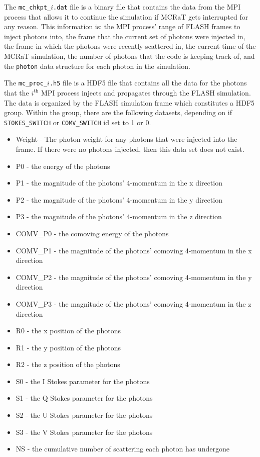\documentclass[12pt,a4paper]{article}
\begin{document}
The \texttt{mc\_chkpt\_$i$.dat} file is a binary file that contains the data from the MPI process that allows it to continue the simulation if MCRaT gets interrupted for any reason. This information is: the MPI process' range of FLASH frames to inject photons into, the frame that the current set of photons were injected in, the frame in which the photons were recently scattered in, the current time of the MCRaT simulation, the number of photons that the code is keeping track of, and the \texttt{photon} data structure for each photon in the simulation.

The \texttt{mc\_proc\_$i$.h5} file is a HDF5 file that contains all the data for the photons that the $i^\mathrm{th}$ MPI process injects and propagates through the FLASH simulation. The data is organized by the FLASH simulation frame which constitutes a HDF5 group. Within the group, there are the following datasets, depending on if \texttt{STOKES\_SWITCH} or \texttt{COMV\_SWITCH} id set to 1 or 0.
\begin{itemize}
\item Weight - The photon weight for any photons that were injected into the frame. If there were no photons injected, then this data set does not exist.
\item P0 - the energy of the photons
\item P1 - the magnitude of the photons' 4-momentum in the x direction
\item P2 - the magnitude of the photons' 4-momentum in the y direction 
\item P3 - the magnitude of the photons' 4-momentum in the z direction
\item COMV\_P0 - the comoving energy of the photons
\item COMV\_P1 - the magnitude of the photons' comoving 4-momentum in the x direction
\item COMV\_P2 - the magnitude of the photons' comoving 4-momentum in the y direction 
\item COMV\_P3 - the magnitude of the photons' comoving 4-momentum in the z direction
\item R0 - the x position of the photons
\item R1 - the y position of the photons
\item R2 - the z position of the photons
\item S0 - the I Stokes parameter for the photons
\item S1 - the Q Stokes parameter for the photons
\item S2 - the U Stokes parameter for the photons
\item S3 - the V Stokes parameter for the photons
\item NS - the cumulative number of scattering each photon has undergone
\end{itemize}
\end{document}
